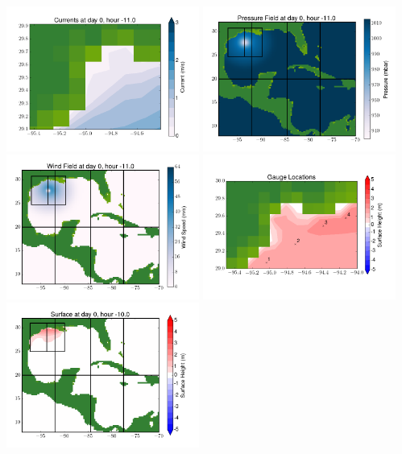 \documentclass[11pt]{article}
\begin{document}
\vskip 10pt 
\includegraphics[width=0.475\textwidth]{frame0061fig7.png}
\includegraphics[width=0.475\textwidth]{frame0061fig8.png}
\vskip 10pt 
\includegraphics[width=0.475\textwidth]{frame0061fig9.png}
\includegraphics[width=0.475\textwidth]{frame0061fig10.png}
\vskip 10pt 
\includegraphics[width=0.475\textwidth]{frame0062fig1.png}
\end{document}
